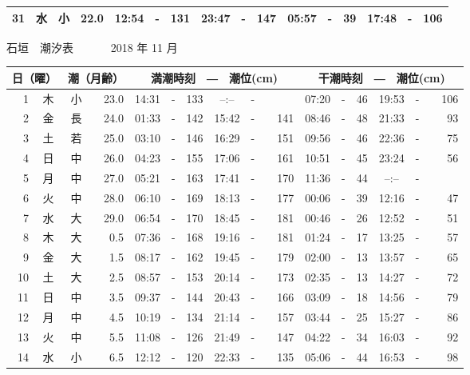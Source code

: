 \documentclass[12pt.a4j]{jsarticle}
\begin{document}
\begin{center}
\begin{table}[ht]
\begin{tabular}{|rc|cr|ccrccr|ccrccr|}
31 & 水 & 小 & 22.0 &  12:54 &-& 131  &  23:47 &-& 147  &   05:57 &-&  39  &   17:48 &-& 106  \\
   \hline
   \end{tabular}
\end{table}
\newpage
 {\LARGE 石垣　潮汐表　　　}
 {\large 2018 年 11 月}\\
 \begin{table}[ht]
    \begin{tabular}{|rc|cr|ccrccr|ccrccr|}
    \hline
    \multicolumn{2}{|c|}{日（曜）} & \multicolumn{2}{c|}{潮（月齢）} & \multicolumn{6}{c|}{満潮時刻　―　潮位(cm)} & \multicolumn{6}{c|}{干潮時刻　―　潮位(cm)} \\
 \hline
 1 & 木 & 小 & 23.0 &  14:31 &-& 133  &  --:-- &-&~~~~~ &   07:20 &-&  46  &   19:53 &-& 106  \\
 2 & 金 & 長 & 24.0 &  01:33 &-& 142  &  15:42 &-& 141  &   08:46 &-&  48  &   21:33 &-&  93  \\
 3 & 土 & 若 & 25.0 &  03:10 &-& 146  &  16:29 &-& 151  &   09:56 &-&  46  &   22:36 &-&  75  \\
 4 & 日 & 中 & 26.0 &  04:23 &-& 155  &  17:06 &-& 161  &   10:51 &-&  45  &   23:24 &-&  56  \\
 5 & 月 & 中 & 27.0 &  05:21 &-& 163  &  17:41 &-& 170  &   11:36 &-&  44  &   --:-- &-&~~~~~ \\
 6 & 火 & 中 & 28.0 &  06:10 &-& 169  &  18:13 &-& 177  &   00:06 &-&  39  &   12:16 &-&  47  \\
 7 & 水 & 大 & 29.0 &  06:54 &-& 170  &  18:45 &-& 181  &   00:46 &-&  26  &   12:52 &-&  51  \\
 8 & 木 & 大 &  0.5 &  07:36 &-& 168  &  19:16 &-& 181  &   01:24 &-&  17  &   13:25 &-&  57  \\
 9 & 金 & 大 &  1.5 &  08:17 &-& 162  &  19:45 &-& 179  &   02:00 &-&  13  &   13:57 &-&  65  \\
10 & 土 & 大 &  2.5 &  08:57 &-& 153  &  20:14 &-& 173  &   02:35 &-&  13  &   14:27 &-&  72  \\
11 & 日 & 中 &  3.5 &  09:37 &-& 144  &  20:43 &-& 166  &   03:09 &-&  18  &   14:56 &-&  79  \\
12 & 月 & 中 &  4.5 &  10:19 &-& 134  &  21:14 &-& 157  &   03:44 &-&  25  &   15:27 &-&  86  \\
13 & 火 & 中 &  5.5 &  11:08 &-& 126  &  21:49 &-& 147  &   04:22 &-&  34  &   16:03 &-&  92  \\
14 & 水 & 小 &  6.5 &  12:12 &-& 120  &  22:33 &-& 135  &   05:06 &-&  44  &   16:53 &-&  98  \\

\end{tabular}
\end{table}
\end{center}
\end{document}
